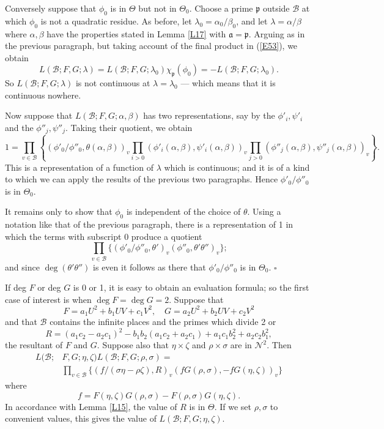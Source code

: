 \documentclass[12pt]{article}
\def\fa{{\mathfrak a}}
\def\fp{{\mathfrak p}}
\def\ga{{\alpha}}
\def\gb{{\beta}}
\def\gl{{\lambda}}
\def\gs{{\sigma}}
\def\gt{{\theta}}
\def\gT{{\Theta}}
\def\sB{{\mathcal B}}
\def\sN{{\mathcal N}}
\def\qed{{\hfill$\square$}}
\def\beq{\begin{equation} \label}
\begin{document}
Conversely suppose that $\phi_0$ is in $\gT$ but not in $\gT_0$. Choose
a prime $\fp$ outside $\sB$ at which $\phi_0$ is not a quadratic residue.
As before, let $\gl_0=\ga_0/\gb_0$, and let $\gl=\ga/\gb$ where $\ga,\gb$
have the properties stated in Lemma \ref{L17} with $\fa=\fp$.
Arguing as in the previous paragraph,
but taking account of the final product in (\ref{E53}), we obtain
\[ L(\sB;F,G;\gl)=L(\sB;F,G;\gl_0)\chi_\fp(\phi_0)=-L(\sB;F,G;\gl_0). \]
So $L(\sB;F,G;\gl)$ is not continuous at $\gl=\gl_0$ --- which means that it
is continuous nowhere.

Now suppose that $L(\sB;F,G;\ga,\gb)$ has two representations, say by
the $\phi'_i,\psi'_i$ and the $\phi''_j,\psi''_j$. Taking their quotient, we
obtain
\[ 1=\prod_{v\in\sB}\left\{(\phi'_0/\phi''_0,\gt(\ga,\gb))_v\prod_{i>0}
(\phi'_i(\ga,\gb)
,\psi'_i(\ga,\gb))_v\prod_{j>0}(\phi''_j(\ga,\gb),\psi''_j(\ga,\gb))_v
\right\}. \]
This is a representation of a function of $\gl$ which is
continuous; and it is of a kind
to which we can apply the results of the previous two paragraphs. Hence
$\phi'_0/\phi''_0$ is in $\gT_0$.

It remains only to show that $\phi_0$ is independent of the choice of $\gt$.
Using a notation like that of the previous paragraph, there is a representation
of 1 in which the terms with subscript 0 produce a quotient
\[ \prod_{v\in\sB}\{(\phi'_0/\phi''_0,\gt')_v(\phi''_0,\gt'\gt'')_v\}; \]
and since $\deg(\gt'\gt'')$ is even it follows as there
that $\phi'_0/\phi''_0$ is in $\gT_0$.
\qed

If deg $F$ or deg $G$ is 0 or 1, it is easy to obtain an
evaluation formula;
so the first case of interest is when $\deg F=\deg G=2$. Suppose that
\beq{E58} F=a_1U^2+b_1UV+c_1V^2, \quad G=a_2U^2+b_2UV+c_2V^2
\end{equation}
and that $\sB$ contains the infinite places and the primes which divide 2 or
\[ R=(a_1c_2-a_2c_1)^2-b_1b_2(a_1c_2+a_2c_1)+a_1c_1b_2^2+a_2c_2b_1^2, \]
the resultant of $F$ and $G$. Suppose also that $\eta\times\zeta$ and $\rho
\times\gs$ are in $\sN^2$. Then
\begin{align*} L(\sB; & F,G;\eta,\zeta)L(\sB;F,G;\rho,\gs)= \\
 & \prod_{v\in\sB}\{(f/(\gs\eta-\rho\zeta),R)_v(fG(\rho,\gs),
-fG(\eta,\zeta))_v\}
\end{align*}
where
\[ f=F(\eta,\zeta)G(\rho,\gs)-F(\rho,\gs)G(\eta,\zeta). \]
In accordance with Lemma \ref{L15}, the value of $R$ is in $\gT$. If we set
$\rho,\gs$ to convenient values, this gives the value of
$L(\sB;F,G;\eta,\zeta)$.
\end{document}
